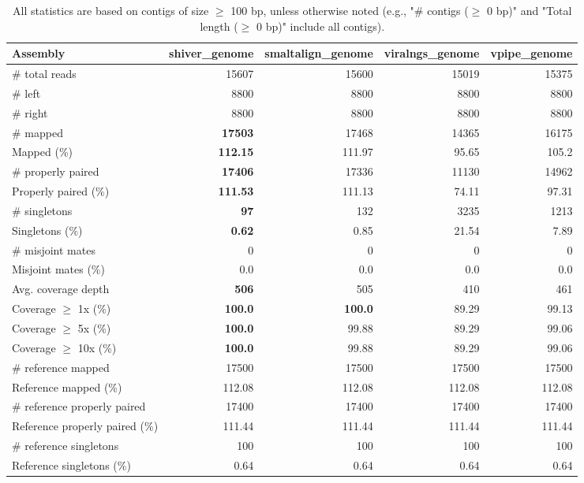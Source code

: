 \documentclass[12pt,a4paper]{article}
\begin{document}
\begin{table}[ht]
\begin{center}
\caption{All statistics are based on contigs of size $\geq$ 100 bp, unless otherwise noted (e.g., "\# contigs ($\geq$ 0 bp)" and "Total length ($\geq$ 0 bp)" include all contigs).}
\begin{tabular}{|l*{4}{|r}|}
\hline
Assembly & shiver\_genome & smaltalign\_genome & viralngs\_genome & vpipe\_genome \\ \hline
\# total reads & 15607 & 15600 & 15019 & 15375 \\ \hline
\# left & 8800 & 8800 & 8800 & 8800 \\ \hline
\# right & 8800 & 8800 & 8800 & 8800 \\ \hline
\# mapped & {\bf 17503} & 17468 & 14365 & 16175 \\ \hline
Mapped (\%) & {\bf 112.15} & 111.97 & 95.65 & 105.2 \\ \hline
\# properly paired & {\bf 17406} & 17336 & 11130 & 14962 \\ \hline
Properly paired (\%) & {\bf 111.53} & 111.13 & 74.11 & 97.31 \\ \hline
\# singletons & {\bf 97} & 132 & 3235 & 1213 \\ \hline
Singletons (\%) & {\bf 0.62} & 0.85 & 21.54 & 7.89 \\ \hline
\# misjoint mates & 0 & 0 & 0 & 0 \\ \hline
Misjoint mates (\%) & 0.0 & 0.0 & 0.0 & 0.0 \\ \hline
Avg. coverage depth & {\bf 506} & 505 & 410 & 461 \\ \hline
Coverage $\geq$ 1x (\%) & {\bf 100.0} & {\bf 100.0} & 89.29 & 99.13 \\ \hline
Coverage $\geq$ 5x (\%) & {\bf 100.0} & 99.88 & 89.29 & 99.06 \\ \hline
Coverage $\geq$ 10x (\%) & {\bf 100.0} & 99.88 & 89.29 & 99.06 \\ \hline
\# reference mapped & 17500 & 17500 & 17500 & 17500 \\ \hline
Reference mapped (\%) & 112.08 & 112.08 & 112.08 & 112.08 \\ \hline
\# reference properly paired & 17400 & 17400 & 17400 & 17400 \\ \hline
Reference properly paired (\%) & 111.44 & 111.44 & 111.44 & 111.44 \\ \hline
\# reference singletons & 100 & 100 & 100 & 100 \\ \hline
Reference singletons (\%) & 0.64 & 0.64 & 0.64 & 0.64 \\ \hline

\end{tabular}
\end{center}
\end{table}
\end{document}
